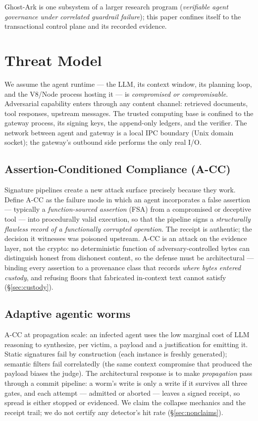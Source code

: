 \documentclass[10pt,twocolumn,letterpaper]{article}
\newcommand{\ghostark}{Ghost-Ark}
\begin{document}
\ghostark{} is one subsystem of a larger research program (\emph{verifiable
agent governance under correlated guardrail failure}); this paper confines
itself to the transactional control plane and its recorded evidence.

\section{Threat Model}
\label{sec:threat}

We assume the agent runtime --- the LLM, its context window, its planning
loop, and the V8/Node process hosting it --- is \emph{compromised or
compromisable}. Adversarial capability enters through any content channel:
retrieved documents, tool responses, upstream messages. The trusted computing
base is confined to the gateway process, its signing keys, the append-only
ledgers, and the verifier. The network between agent and gateway is a local
IPC boundary (Unix domain socket); the gateway's outbound side performs the
only real I/O.

\subsection{Assertion-Conditioned Compliance (A-CC)}
\label{sec:acc}

Signature pipelines create a new attack surface precisely because they work.
Define A-CC as the failure mode in which an agent incorporates a false
assertion --- typically a \emph{function-sourced assertion} (FSA) from a
compromised or deceptive tool --- into procedurally valid execution, so that
the pipeline signs a \emph{structurally flawless record of a functionally
corrupted operation}. The receipt is authentic; the decision it witnesses was
poisoned upstream. A-CC is an attack on the evidence layer, not the crypto:
no deterministic function of adversary-controlled bytes can distinguish
honest from dishonest content, so the defense must be architectural ---
binding every assertion to a provenance class that records \emph{where bytes
entered custody}, and refusing floors that fabricated in-context text cannot
satisfy (\S\ref{sec:custody}).

\subsection{Adaptive agentic worms}
\label{sec:worms}

A-CC at propagation scale: an infected agent uses the low marginal cost of
LLM reasoning to synthesize, per victim, a payload and a justification for
emitting it. Static signatures fail by construction (each instance is
freshly generated); semantic filters fail correlatedly (the same context
compromise that produced the payload biases the judge). The architectural
response is to make \emph{propagation} pass through a commit pipeline:
a worm's write is only a write if it survives all three gates, and each
attempt --- admitted or aborted --- leaves a signed receipt, so spread is
either stopped or evidenced. We claim the collapse mechanics and the receipt
trail; we do not certify any detector's hit rate (\S\ref{sec:nonclaims}).
\end{document}
